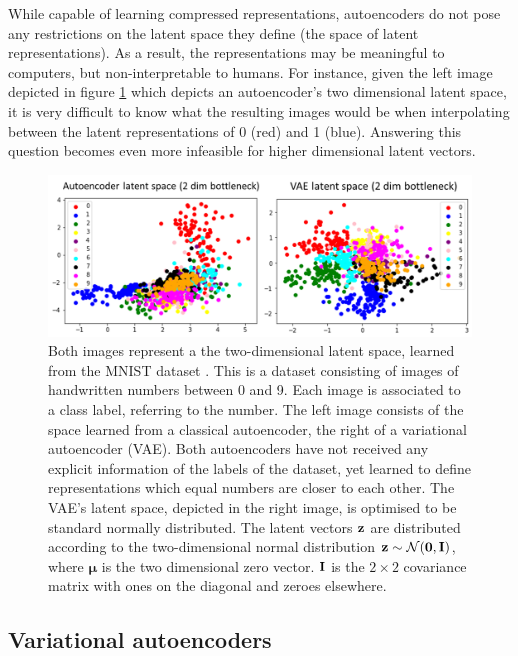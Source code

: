 While capable of learning compressed representations, autoencoders do not pose any restrictions on the latent space they define (the space of latent representations). As a result, the representations may be meaningful to computers, but non-interpretable to humans. For instance, given the left image depicted in figure \ref{fig:latent_space_2d} which depicts an autoencoder's two dimensional latent space, it is very difficult to know what the resulting images would be when interpolating between the latent representations of 0 (red) and 1 (blue). Answering this question becomes even more infeasible for higher dimensional latent vectors.

\begin{figure}
	\centering
	\includegraphics[width=0.7\linewidth]{screenshot021}
	\caption{ Both images represent a the two-dimensional latent space, learned from the MNIST dataset \cite{PapersCodeMNIST}. This is a dataset consisting of images of handwritten numbers between 0 and 9. Each image is associated to a class label, referring to the number. The left image consists of the space learned from a classical autoencoder, the right of a variational autoencoder (VAE). Both autoencoders have not received any explicit information of the labels of the dataset, yet learned to define representations which equal numbers are closer to each other. The VAE's latent space, depicted in the right image, is optimised to be standard normally distributed. The latent vectors $\mathbf{z}$ are distributed according to the two-dimensional normal distribution $\mathbf{z} \sim \mathcal{N}(\bm{\mathbf{0}}, \mathbf{I})$, where $\bm{\mu}$ is the two dimensional zero vector. $\mathbf{I}$ is the $2 \times 2$ covariance matrix with ones on the diagonal and zeroes elsewhere.}
	\label{fig:latent_space_2d}
\end{figure}



\subsection{Variational autoencoders}

